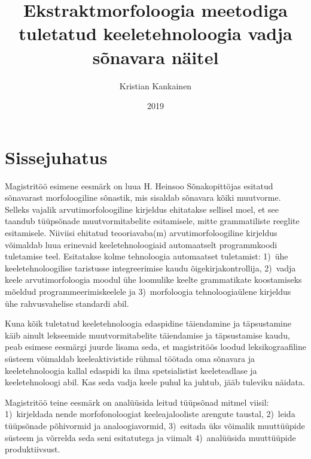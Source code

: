 \documentclass[12pt,a4paper]{article}
\begin{document}
\title{Ekstraktmorfoloogia meetodiga tuletatud keeletehnoloogia vadja sõnavara näitel}
\author{Kristian Kankainen}
\date{2019}
\maketitle


\newpage
\tableofcontents




\newpage
{}
\section{Sissejuhatus}

Magistritöö esimene eesmärk on luua H. Heinsoo Sõnakopittöjas esitatud sõnavarast morfoloogiline sõnastik, mis sisaldab sõnavara kõiki muutvorme. Selleks vajalik arvutimorfoloogiline kirjeldus ehitatakse sellisel moel, et see taandub tüüpsõnade muutvormitabelite esitamisele, mitte grammatiliste reeglite esitamisele. Niiviisi ehitatud teooriavaba(m) arvutimorfoloogiline kirjeldus võimaldab luua erinevaid keeletehnoloogiaid automaatselt programmkoodi tuletamise teel. Esitatakse kolme tehnoloogia automaatset tuletamist: 1)~ühe keeletehnoloogilise taristusse integreerimise kaudu õigekirjakontrollija, 2)~vadja keele arvutimorfoloogia moodul ühe loomulike keelte grammatikate koostamiseks mõeldud programmeerimiskeelele ja 3)~morfoloogia tehnoloogiaülene kirjeldus ühe rahvusvahelise standardi abil.

Kuna kõik tuletatud keeletehnoloogia edaspidine täiendamine ja täpsustamine käib ainult lekseemide muutvormitabelite täiendamise ja täpsustamise kaudu, peab esimese eesmärgi juurde lisama seda, et magistritöös loodud leksikograafiline süsteem võimaldab keeleaktivistide rühmal töötada oma sõnavara ja keeletehnoloogia kallal edaspidi ka ilma spetsialistist keeleteadlase ja keeletehnoloogi abil. Kas seda vadja keele puhul ka juhtub, jääb tuleviku näidata.

Magistritöö teine eesmärk on analüüsida leitud tüüpsõnad mitmel viisil: 1)~kirjeldada nende morfofonoloogiat keeleajalooliste arengute taustal, 2)~leida tüüpsõnade põhivormid ja analoogiavormid, 3)~esitada üks võimalik muuttüüpide süsteem ja võrrelda seda seni esitatutega ja viimalt 4)~analüüsida muuttüüpide produktiivsust.
\end{document}
